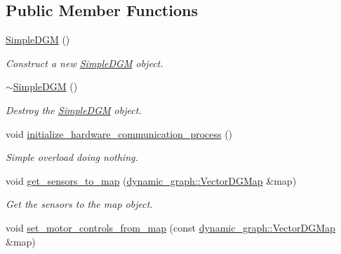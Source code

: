 \subsection*{Public Member Functions}
\begin{DoxyCompactItemize}
\item 
\mbox{\label{classdynamic__graph__manager_1_1SimpleDGM_abb548458a154ee8e9ae63a32f1191ef6}} 
\hyperlink{classdynamic__graph__manager_1_1SimpleDGM_abb548458a154ee8e9ae63a32f1191ef6}{Simple\+D\+GM} ()
\begin{DoxyCompactList}\small\item\em Construct a new \hyperlink{classdynamic__graph__manager_1_1SimpleDGM}{Simple\+D\+GM} object. \end{DoxyCompactList}\item 
\mbox{\label{classdynamic__graph__manager_1_1SimpleDGM_a250f18b97619c72446074662626423d4}} 
\hyperlink{classdynamic__graph__manager_1_1SimpleDGM_a250f18b97619c72446074662626423d4}{$\sim$\+Simple\+D\+GM} ()
\begin{DoxyCompactList}\small\item\em Destroy the \hyperlink{classdynamic__graph__manager_1_1SimpleDGM}{Simple\+D\+GM} object. \end{DoxyCompactList}\item 
void \hyperlink{classdynamic__graph__manager_1_1SimpleDGM_a5d771fc5a9ae6dd524a658d50fbee5d3}{initialize\+\_\+hardware\+\_\+communication\+\_\+process} ()
\begin{DoxyCompactList}\small\item\em Simple overload doing nothing. \end{DoxyCompactList}\item 
void \hyperlink{classdynamic__graph__manager_1_1SimpleDGM_aa92cd33a31c934835252f834bab7b9f4}{get\+\_\+sensors\+\_\+to\+\_\+map} (\hyperlink{namespacedynamic__graph_a51212ed7fa4ae81e7b362a27f09b7ab8}{dynamic\+\_\+graph\+::\+Vector\+D\+G\+Map} \&map)
\begin{DoxyCompactList}\small\item\em Get the sensors to the map object. \end{DoxyCompactList}\item 
void \hyperlink{classdynamic__graph__manager_1_1SimpleDGM_ad38ccd35cc0c409a0aaefa8565634109}{set\+\_\+motor\+\_\+controls\+\_\+from\+\_\+map} (const \hyperlink{namespacedynamic__graph_a51212ed7fa4ae81e7b362a27f09b7ab8}{dynamic\+\_\+graph\+::\+Vector\+D\+G\+Map} \&map)

\end{DoxyCompactItemize}
